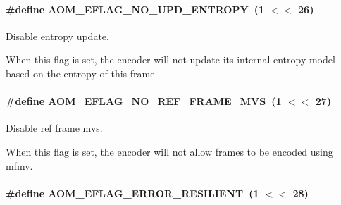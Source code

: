 \paragraph[{\texorpdfstring{A\+O\+M\+\_\+\+E\+F\+L\+A\+G\+\_\+\+N\+O\+\_\+\+U\+P\+D\+\_\+\+E\+N\+T\+R\+O\+PY}{AOM_EFLAG_NO_UPD_ENTROPY}}]{\setlength{\rightskip}{0pt plus 5cm}\#define A\+O\+M\+\_\+\+E\+F\+L\+A\+G\+\_\+\+N\+O\+\_\+\+U\+P\+D\+\_\+\+E\+N\+T\+R\+O\+PY~(1 $<$$<$ 26)}\hypertarget{group__aom__encoder_gac5a69f04b0bc88f755587a1da815d754}{}\label{group__aom__encoder_gac5a69f04b0bc88f755587a1da815d754}


Disable entropy update. 

When this flag is set, the encoder will not update its internal entropy model based on the entropy of this frame. 
\paragraph[{\texorpdfstring{A\+O\+M\+\_\+\+E\+F\+L\+A\+G\+\_\+\+N\+O\+\_\+\+R\+E\+F\+\_\+\+F\+R\+A\+M\+E\+\_\+\+M\+VS}{AOM_EFLAG_NO_REF_FRAME_MVS}}]{\setlength{\rightskip}{0pt plus 5cm}\#define A\+O\+M\+\_\+\+E\+F\+L\+A\+G\+\_\+\+N\+O\+\_\+\+R\+E\+F\+\_\+\+F\+R\+A\+M\+E\+\_\+\+M\+VS~(1 $<$$<$ 27)}\hypertarget{group__aom__encoder_ga31943c4d9e34f90a0691949109c224fd}{}\label{group__aom__encoder_ga31943c4d9e34f90a0691949109c224fd}


Disable ref frame mvs. 

When this flag is set, the encoder will not allow frames to be encoded using mfmv. 
\paragraph[{\texorpdfstring{A\+O\+M\+\_\+\+E\+F\+L\+A\+G\+\_\+\+E\+R\+R\+O\+R\+\_\+\+R\+E\+S\+I\+L\+I\+E\+NT}{AOM_EFLAG_ERROR_RESILIENT}}]{\setlength{\rightskip}{0pt plus 5cm}\#define A\+O\+M\+\_\+\+E\+F\+L\+A\+G\+\_\+\+E\+R\+R\+O\+R\+\_\+\+R\+E\+S\+I\+L\+I\+E\+NT~(1 $<$$<$ 28)}\hypertarget{group__aom__encoder_gaf8d13359c477e5787cf67b6e583317a0}{}\label{group__aom__encoder_gaf8d13359c477e5787cf67b6e583317a0}


